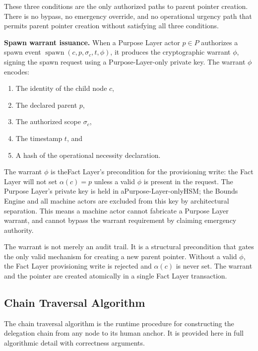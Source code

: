These three conditions are the only authorized paths to parent pointer creation. There is no bypass, no emergency override, and no operational urgency path that permits parent pointer creation without satisfying all three conditions.

\medskip
\noindent\textbf{Spawn warrant issuance.} When a Purpose Layer actor $p \in P$ authorizes a spawn event $\operatorname{spawn}(c, p, \sigma_c, t, \phi)$, it produces the cryptographic warrant $\phi$, signing the spawn request using a Purpose-Layer-only private key. The warrant $\phi$ encodes:

\begin{enumerate}
\item The identity of the child node $c$,
\item The declared parent $p$,
\item The authorized scope $\sigma_c$,
\item The timestamp $t$, and
\item A hash of the operational necessity declaration.
\end{enumerate}

The warrant $\phi$ is theFact Layer's precondition for the provisioning write: the Fact Layer will not set $\alpha(c) = p$ unless a valid $\phi$ is present in the request. The Purpose Layer's private key is held in aPurpose-Layer-onlyHSM; the Bounds Engine and all machine actors are excluded from this key by architectural separation. This means a machine actor cannot fabricate a Purpose Layer warrant, and cannot bypass the warrant requirement by claiming emergency authority.

The warrant is not merely an audit trail. It is a structural precondition that gates the only valid mechanism for creating a new parent pointer. Without a valid $\phi$, the Fact Layer provisioning write is rejected and $\alpha(c)$ is never set. The warrant and the pointer are created atomically in a single Fact Layer transaction.

\subsection{Chain Traversal Algorithm}
\label{sec:chain-traversal-algorithm}

The chain traversal algorithm is the runtime procedure for constructing the delegation chain from any node to its human anchor. It is provided here in full algorithmic detail with correctness arguments.

